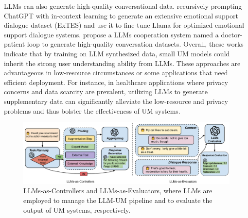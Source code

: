 \documentclass[11pt]{article}
\newcommand{\edit}[1]{\textcolor{blue}{#1}}
\newcommand{\comments}[1]{\textcolor{red}{[Re:~#1]}}
\begin{document}
LLMs can also generate high-quality conversational data. \citet{zheng2023building} recursively prompting ChatGPT with in-context learning to generate an extensive emotional support dialogue dataset (ExTES) and use it to fine-tune Llama for optimized emotional support dialogue systems. \citet{wang2023umass_bionlp} propose a LLMs cooperation system named a doctor-patient loop to generate high-quality conversation datasets. 
Overall, these works indicate that by training on LLM synthesized data, small UM models could inherit the strong user understanding ability from LLMs. These approaches are advantageous in low-resource circumstances or some applications that need efficient deployment. For instance, in healthcare applications where privacy concerns and data scarcity are prevalent, utilizing LLMs to generate supplementary data can significantly alleviate the low-resource and privacy problems and thus bolster the effectiveness of UM systems.

\begin{figure}[t]
    \centering
    \includegraphics[width=1\linewidth]{submissions/Meng2023/figs/LLM-UM_controller_evaluator.pdf}
    \vspace{-0.3in}
    \caption{LLMs-as-Controllers and LLMs-as-Evaluators, where LLMs are employed to manage the LLM-UM pipeline and to evaluate the output of UM systems, respectively.}
    \label{fig:enter-label}
\end{figure}
\end{document}
